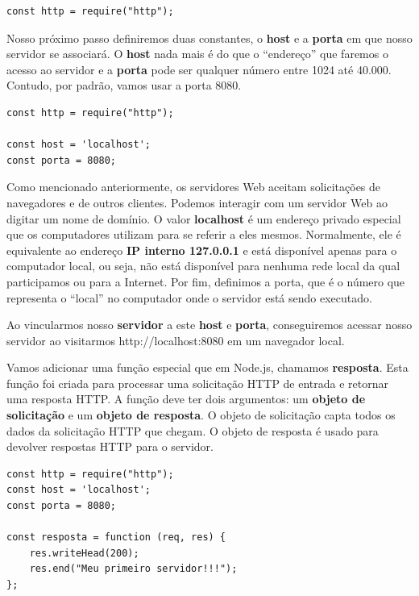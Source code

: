 \begin{verbatim}
const http = require("http");
\end{verbatim}

Nosso próximo passo definiremos duas constantes, o \textbf{host} e a \textbf{porta} em que nosso servidor se associará. O \textbf{host} nada mais é do que o ``endereço'' que faremos o acesso ao servidor e a \textbf{porta} pode ser qualquer número entre 1024 até 40.000. Contudo, por padrão, vamos usar a porta 8080.

\begin{verbatim}
const http = require("http");

const host = 'localhost';
const porta = 8080;
\end{verbatim} 

Como mencionado anteriormente, os servidores Web aceitam solicitações de navegadores e de outros clientes. Podemos interagir com um servidor Web ao digitar um nome de domínio. O valor \textbf{localhost} é um endereço privado especial que os computadores utilizam para se referir a eles mesmos. Normalmente, ele é equivalente ao endereço \textbf{IP interno 127.0.0.1} e está disponível apenas para o computador local, ou seja, não está disponível para nenhuma rede local da qual participamos ou para a Internet. Por fim, definimos a porta, que é o número que representa o ``local'' no computador onde o servidor está sendo executado. 

Ao vincularmos nosso \textbf{servidor} a este \textbf{host} e \textbf{porta}, conseguiremos acessar nosso servidor ao visitarmos http://localhost:8080 em um navegador local.

Vamos adicionar uma função especial que em Node.js, chamamos \textbf{resposta}. Esta função foi criada para processar uma solicitação HTTP de entrada e retornar uma resposta HTTP. A função deve ter dois argumentos: um \textbf{objeto de solicitação} e um \textbf{objeto de resposta}. O objeto de solicitação capta todos os dados da solicitação HTTP que chegam. O objeto de resposta é usado para devolver respostas HTTP para o servidor.

\begin{verbatim}
const http = require("http");
const host = 'localhost';
const porta = 8080;

const resposta = function (req, res) {
	res.writeHead(200);
	res.end("Meu primeiro servidor!!!");
};
\end{verbatim}

